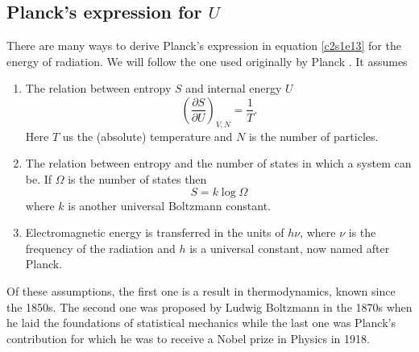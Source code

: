 \subsection{Planck's expression for $U$}
There are many ways to derive Planck's expression in equation \eqref{c2s1e13}
for the energy of radiation. We will follow the one used originally by Planck
\cite{planck1901law}. It assumes
\begin{enumerate}
\item The relation between entropy $S$ and internal energy $U$
\begin{equation}\label{c2s1e15}
\left(\frac{\partial S}{\partial U}\right)_{V, N} = \frac{1}{T}.
\end{equation}
Here $T$ us the (absolute) temperature and $N$ is the number of particles.
\item The relation between entropy and the number of states in which a system
can be. If $\Omega$ is the number of states then
\begin{equation}\label{c2s1e16}
S = k\log\Omega
\end{equation}
where $k$ is another universal Boltzmann constant.
\item Electromagnetic energy is transferred in the units of $h\nu$, where $\nu$
is the frequency of the radiation and $h$ is a universal constant, now named 
after Planck. 
\end{enumerate}
Of these assumptions, the first one is a result in thermodynamics, known since 
the 1850s. The second one was proposed by Ludwig Boltzmann in the 1870s when he
laid the foundations of statistical mechanics while the last one was Planck's 
contribution for which he was to receive a Nobel prize in Physics in 1918.

